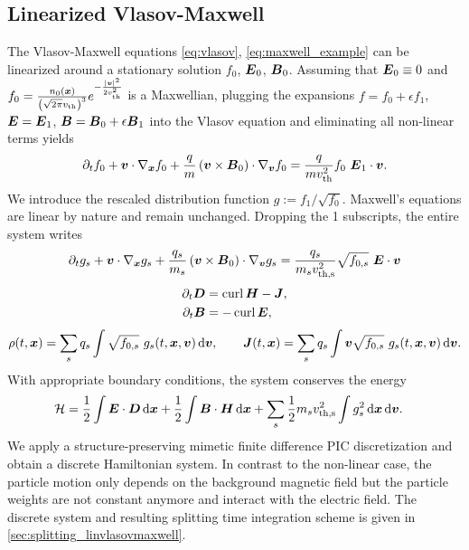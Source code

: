 \documentclass[11pt]{article}
\begin{document}
\subsection{Linearized Vlasov-Maxwell}
The Vlasov-Maxwell equations \ref*{eq:vlasov}, \ref*{eq:maxwell_example} can be linearized around a stationary solution $f_0$, $\boldsymbol E_0$, $\boldsymbol B_0$. Assuming that $\boldsymbol E_0 \equiv 0$ and $f_0 = \frac{n_0({\boldsymbol x})}{\left(\sqrt{2\pi} v_\text{th}\right)^3} e^{-\frac{\lvert{\boldsymbol v}\rvert^2}{2 v_\text{th}^2}}$ is a Maxwellian, plugging the expansions $f = f_0 + \epsilon f_1$, $\boldsymbol E = \boldsymbol E_1$, $\boldsymbol B = \boldsymbol B_0 + \epsilon \boldsymbol B_1$ into the Vlasov equation and eliminating all non-linear terms yields
\begin{equation}
    {\partial_{t}} f_0 + {\boldsymbol v} \cdot \nabla_{\boldsymbol x} f_0 + \frac{q}{m} \left({\boldsymbol v} \times \boldsymbol B_0\right) \cdot \nabla_{\boldsymbol v} f_0 = \frac{q}{m v_\text{th}^2} f_0~ \boldsymbol E_1 \cdot {\boldsymbol v}.
\end{equation}
We introduce the rescaled distribution function $g := f_1 / \sqrt{f_0}$. Maxwell's equations are linear by nature and remain unchanged. Dropping the 1 subscripts, the entire system writes
\begin{equation}
    {\partial_{t}} g_s + {\boldsymbol v} \cdot \nabla_{\boldsymbol x} g_s + \frac{q_s}{m_s} \left({\boldsymbol v} \times \boldsymbol B_0\right) \cdot \nabla_{\boldsymbol v} g_s = \frac{q_s}{m_s v_\text{th,s}^2} \sqrt{f_{0,s}}~\boldsymbol E \cdot {\boldsymbol v}
\end{equation}
\begin{align}
    {\partial_{t}} \boldsymbol D & = \operatorname{curl} \boldsymbol H - \boldsymbol J, \\
    {\partial_{t}} \boldsymbol B & = - \operatorname{curl} \boldsymbol E,
\end{align}
\begin{equation}
    \rho(t, {\boldsymbol x}) = \sum_s q_s \int \sqrt{f_{0,s}}~ g_s(t, {\boldsymbol x}, {\boldsymbol v}) \, {\rm d}{\boldsymbol v}, \qquad \boldsymbol J(t,{\boldsymbol x}) = \sum_s q_s \int {\boldsymbol v} \sqrt{f_{0,s}}~ g_s(t, {\boldsymbol x}, {\boldsymbol v}) \, {\rm d}{\boldsymbol v}.
\end{equation}
With appropriate boundary conditions, the system conserves the energy
\begin{align}
    \mathcal{H} & = \frac{1}{2} \int \boldsymbol E \cdot \boldsymbol D \, {\rm d}{\boldsymbol x} + \frac{1}{2} \int \boldsymbol B \cdot \boldsymbol H \, {\rm d}{\boldsymbol x} + \sum_s \frac{1}{2} m_s v_\text{th,s}^2 \int g_s^2 \, {\rm d}{\boldsymbol x} \, {\rm d}{\boldsymbol v}.
\end{align}
We apply a structure-preserving mimetic finite difference PIC discretization and obtain a discrete Hamiltonian system. In contrast to the non-linear case, the particle motion only depends on the background magnetic field but the particle weights are not constant anymore and interact with the electric field.
The discrete system and resulting splitting time integration scheme is given in \ref{sec:splitting_linvlasovmaxwell}.
\end{document}
